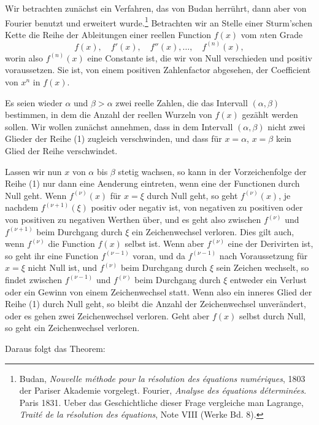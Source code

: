 \documentclass[11pt]{article}
\begin{document}
Wir betrachten zunächst ein Verfahren, das von Budan herrührt, dann aber von Fourier benutzt und erweitert wurde.\footnote{Budan, \emph{Nouvelle méthode pour la résolution des équations numériques}, 1803 der Pariser Akademie vorgelegt. Fourier, \emph{Analyse des équations déterminées}. Paris 1831. Ueber das Geschichtliche dieser Frage vergleiche man Lagrange, \emph{Traité de la résolution des équations}, Note VIII (Werke Bd. 8).} Betrachten wir an Stelle einer Sturm'schen Kette die Reihe der Ableitungen einer reellen Function $f(x)$ vom $n$ten Grade
\begin{equation}
        f(x),\quad f'(x),\quad f''(x),\ldots,\quad f^{(n)}(x),
\tag{1}
\end{equation}
worin also $f^{(n)}(x)$ eine Constante ist, die wir von Null verschieden und positiv voraussetzen. Sie ist, von einem positiven Zahlenfactor abgesehen, der Coefficient von $x^n$ in $f(x)$.

Es seien wieder $\alpha$ und $\beta>\alpha$ zwei reelle Zahlen, die das Intervall $(\alpha,\beta)$ bestimmen, in dem die Anzahl der reellen Wurzeln von $f(x)$ gezählt werden sollen. Wir wollen zunächst annehmen, dass in dem Intervall $(\alpha,\beta)$ nicht zwei Glieder der Reihe (1) zugleich verschwinden, und dass für $x=\alpha$, $x=\beta$ kein Glied der Reihe verschwindet.

Lassen wir nun $x$ von $\alpha$ bis $\beta$ stetig wachsen, so kann in der Vorzeichenfolge der Reihe (1) nur dann eine Aenderung eintreten, wenn eine der Functionen durch Null geht. Wenn $f^{(\nu)}(x)$ für $x=\xi$ durch Null geht, so geht $f^{(\nu)}(x)$, je nachdem $f^{(\nu+1)}(\xi)$ positiv oder negativ ist, von negativen zu positiven oder von positiven zu negativen Werthen über, und es geht also zwischen $f^{(\nu)}$ und $f^{(\nu+1)}$ beim Durchgang durch $\xi$ ein Zeichenwechsel verloren. Dies gilt auch, wenn $f^{(\nu)}$ die Function $f(x)$ selbst ist. Wenn aber $f^{(\nu)}$ eine der Derivirten ist, so geht ihr eine Function $f^{(\nu-1)}$ voran, und da $f^{(\nu-1)}$ nach Voraussetzung für $x=\xi$ nicht Null ist, und $f^{(\nu)}$ beim Durchgang durch $\xi$ sein Zeichen wechselt, so findet zwischen $f^{(\nu-1)}$ und $f^{(\nu)}$ beim Durchgang durch $\xi$ entweder ein Verlust oder ein Gewinn von einem Zeichenwechsel statt. Wenn also ein inneres Glied der Reihe (1) durch Null geht, so bleibt die Anzahl der Zeichenwechsel unverändert, oder es gehen zwei Zeichenwechsel verloren. Geht aber $f(x)$ selbst durch Null, so geht ein Zeichenwechsel verloren.

Daraus folgt das Theorem:
\end{document}
